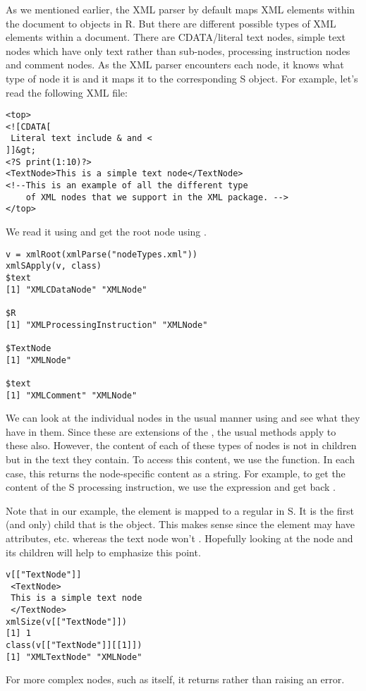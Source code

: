 As we mentioned earlier, the XML parser by default maps XML elements
within the document to  objects in R.  But there are
different possible types of XML elements within a document. There are
CDATA/literal text nodes, simple text nodes which have only text
rather than sub-nodes, processing instruction nodes and comment nodes.
As the XML parser encounters each node, it knows what type of node it
is and it maps it to the corresponding S object.  
For example, let's read the following XML file:
\begin{verbatim}
<top>
<![CDATA[
 Literal text include & and <
]]&gt;
<?S print(1:10)?>
<TextNode>This is a simple text node</TextNode>
<!--This is an example of all the different type
    of XML nodes that we support in the XML package. -->
</top>
\end{verbatim}
We read it using  and
get the root node using .
\begin{verbatim}
v = xmlRoot(xmlParse("nodeTypes.xml"))
xmlSApply(v, class)
$text
[1] "XMLCDataNode" "XMLNode"     

$R
[1] "XMLProcessingInstruction" "XMLNode"                 

$TextNode
[1] "XMLNode"

$text
[1] "XMLComment" "XMLNode"   
\end{verbatim}
We can look at the individual nodes in the usual manner using
\SFunction{[[} and see what they have in them.  Since these are
extensions of the , the usual methods apply to these
also.  However, the content of each of these types of nodes is not in
children but in the text they contain.  To access this content, we use
the  function.  In each case, this returns the
node-specific content as a string.  For example, to get the content of
the S processing instruction, we use the expression
 and get back .

Note that in our example, the  element is mapped to a
regular  in S. It is the first (and only) child that
is the  object.  This makes sense since the
 element may have attributes, etc.  whereas the text
node won't .
Hopefully looking at the node and its children
will help to emphasize this point.
\begin{verbatim}
v[["TextNode"]]
 <TextNode>
 This is a simple text node
 </TextNode>
xmlSize(v[["TextNode"]])
[1] 1
class(v[["TextNode"]][[1]])
[1] "XMLTextNode" "XMLNode"    
\end{verbatim}
For more complex nodes, such as  itself, it returns
\SNull rather than raising an error.



